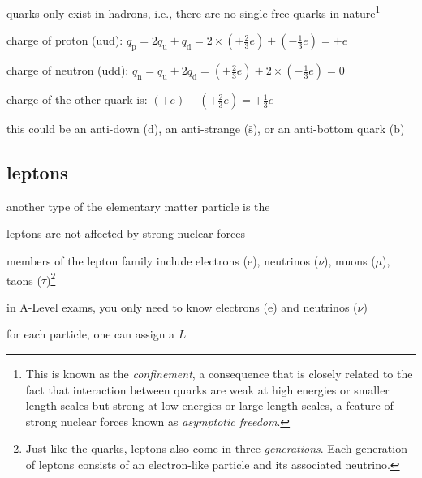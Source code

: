 \cmt quarks only exist in hadrons, i.e., there are no single free quarks in nature\footnote{This is known as the \emph{confinement}, a consequence that is closely related to the fact that interaction between quarks are weak at high energies or smaller length scales but strong at low energies or large length scales, a feature of strong nuclear forces known as \emph{asymptotic freedom}.}



\begin{soln} charge of proton (uud): $q_\text{p} = 2q_\text{u} + q_\text{d} = 2\times\left(+\frac{2}{3}e\right) + \left(-\frac{1}{3}e\right) = +e$

\eqyskip charge of neutron (udd): $q_\text{n} = q_\text{u} + 2q_\text{d} = \left(+\frac{2}{3}e\right) + 2\times\left(-\frac{1}{3}e\right) = 0$ \end{soln}


\begin{soln} charge of the other quark is: $(+e) - \left(+\frac{2}{3}e\right) = +\frac{1}{3}e$

this could be an anti-down ($\bar{\text{d}}$), an anti-strange ($\bar{\text{s}}$), or an anti-bottom quark ($\bar{\text{b}}$)\end{soln}



\subsection{leptons}

another type of the elementary matter particle is the 

\cmt leptons are not affected by strong nuclear forces

\cmt members of the lepton family include electrons (e), neutrinos ($\nu$), muons ($\mu$), taons ($\tau$)\footnote{Just like the quarks, leptons also come in three \emph{generations}. Each generation of leptons consists of an electron-like particle and its associated neutrino.}

in A-Level exams, you only need to know electrons (e) and neutrinos ($\nu$)


\cmt for each particle, one can assign a  $L$

